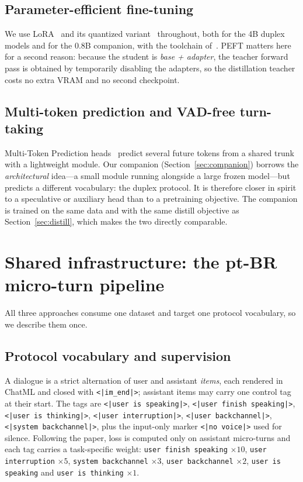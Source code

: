 \documentclass[conference]{IEEEtran}
\begin{document}
\subsection{Parameter-efficient fine-tuning}
We use LoRA~\cite{lora2022} and its quantized
variant~\cite{qlora2023} throughout, both for the 4B duplex models and for the
0.8B companion, with the toolchain of~\cite{unsloth}. PEFT matters here for a
second reason: because the student is \emph{base + adapter}, the teacher forward
pass is obtained by temporarily disabling the adapters, so the distillation
teacher costs no extra VRAM and no second checkpoint.

\subsection{Multi-token prediction and VAD-free turn-taking}
Multi-Token Prediction heads~\cite{deepseek} predict several future tokens from a
shared trunk with a lightweight module. Our companion
(Section~\ref{sec:companion}) borrows the \emph{architectural} idea---a small
module running alongside a large frozen model---but predicts a different
vocabulary: the duplex protocol. It is therefore closer in spirit to a
speculative or auxiliary head than to a pretraining objective. The
companion is trained on the same data and with the same distill objective as
Section~\ref{sec:distill}, which makes the two directly comparable.

\section{Shared infrastructure: the pt-BR micro-turn pipeline}
\label{sec:shared}

All three approaches consume one dataset and target one protocol vocabulary, so
we describe them once.

\subsection{Protocol vocabulary and supervision}
A dialogue is a strict alternation of user and assistant \emph{items}, each
rendered in ChatML and closed with \texttt{<|im\_end|>}; assistant items may carry
one control tag at their start. The tags are \texttt{<|user is speaking|>},
\texttt{<|user finish speaking|>}, \texttt{<|user is thinking|>},
\texttt{<|user interruption|>}, \texttt{<|user backchannel|>},
\texttt{<|system backchannel|>}, plus the input-only marker
\texttt{<|no voice|>} used for silence. Following the paper, loss is computed only
on assistant micro-turns and each tag carries a task-specific weight:
\texttt{user finish speaking} $\times 10$, \texttt{user interruption} $\times 5$,
\texttt{system backchannel} $\times 3$, \texttt{user backchannel} $\times 2$,
\texttt{user is speaking} and \texttt{user is thinking} $\times 1$.
\end{document}
